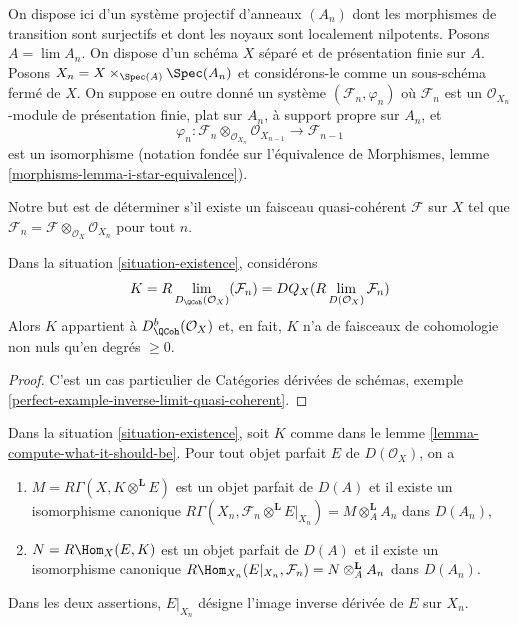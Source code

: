 \begin{situation}
\label{situation-existence}
On dispose ici d'un système projectif d'anneaux $(A_n)$ dont les morphismes de transition
sont surjectifs et dont les noyaux sont localement nilpotents. Posons $A = \lim A_n$. On dispose d'un
schéma $X$ séparé et de présentation finie sur $A$.
Posons $X_n = X \times_{\Spec(A)} \Spec(A_n)$ et
considérons-le comme un sous-schéma fermé de $X$. On suppose en outre donné un système
$(\mathcal{F}_n, \varphi_n)$ où $\mathcal{F}_n$ est un
$\mathcal{O}_{X_n}$-module de présentation finie, plat sur $A_n$, à support propre sur $A_n$,
et
$$
\varphi_n :
\mathcal{F}_n \otimes_{\mathcal{O}_{X_n}} \mathcal{O}_{X_{n - 1}}
\longrightarrow
\mathcal{F}_{n - 1}
$$
est un isomorphisme (notation fondée sur l'équivalence de
Morphismes, lemme \ref{morphisms-lemma-i-star-equivalence}).
\end{situation}

\noindent
Notre but est de déterminer s'il existe un faisceau quasi-cohérent $\mathcal{F}$
sur $X$ tel que
$\mathcal{F}_n = \mathcal{F} \otimes_{\mathcal{O}_X} \mathcal{O}_{X_n}$
pour tout $n$.

\begin{lemma}
\label{lemma-compute-what-it-should-be}
Dans la situation \ref{situation-existence}, considérons
$$
K = R\lim_{D_\QCoh(\mathcal{O}_X)}(\mathcal{F}_n) =
DQ_X(R\lim_{D(\mathcal{O}_X)}\mathcal{F}_n)
$$
Alors $K$ appartient à $D^b_{\QCoh}(\mathcal{O}_X)$ et, en fait,
$K$ n'a de faisceaux de cohomologie non nuls qu'en degrés $\geq 0$.
\end{lemma}

\begin{proof}
C'est un cas particulier de
Catégories dérivées de schémas, exemple
\ref{perfect-example-inverse-limit-quasi-coherent}.
\end{proof}

\begin{lemma}
\label{lemma-compute-against-perfect}
Dans la situation \ref{situation-existence}, soit $K$ comme dans le
lemme \ref{lemma-compute-what-it-should-be}. Pour tout
objet parfait $E$ de $D(\mathcal{O}_X)$, on a
\begin{enumerate}
\item $M = R\Gamma(X, K \otimes^\mathbf{L} E)$ est un objet parfait de $D(A)$
et il existe un isomorphisme canonique
$R\Gamma(X_n, \mathcal{F}_n \otimes^\mathbf{L} E|_{X_n}) =
M \otimes_A^\mathbf{L} A_n$
dans $D(A_n)$,
\item $N = R\Hom_X(E, K)$ est un objet parfait de $D(A)$
et il existe un isomorphisme canonique
$R\Hom_{X_n}(E|_{X_n}, \mathcal{F}_n) = N \otimes_A^\mathbf{L} A_n$
dans $D(A_n)$.
\end{enumerate}
Dans les deux assertions, $E|_{X_n}$ désigne l'image inverse dérivée
de $E$ sur $X_n$.
\end{lemma}

